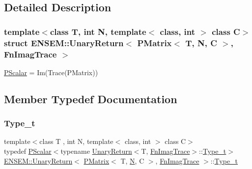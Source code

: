 \subsection{Detailed Description}
\subsubsection*{template$<$class T, int N, template$<$ class, int $>$ class C$>$\newline
struct E\+N\+S\+E\+M\+::\+Unary\+Return$<$ P\+Matrix$<$ T, N, C $>$, Fn\+Imag\+Trace $>$}

\mbox{\hyperlink{classENSEM_1_1PScalar}{P\+Scalar}} = Im(\+Trace(\+P\+Matrix)) 

\subsection{Member Typedef Documentation}
\mbox{\label{structENSEM_1_1UnaryReturn_3_01PMatrix_3_01T_00_01N_00_01C_01_4_00_01FnImagTrace_01_4_a631e4d167f62becbde56ab9d33138ccd}} 
\subsubsection{\texorpdfstring{Type\_t}{Type\_t}\hspace{0.1cm}{\footnotesize\ttfamily [1/3]}}
{\footnotesize\ttfamily template$<$class T , int N, template$<$ class, int $>$ class C$>$ \\
typedef \mbox{\hyperlink{classENSEM_1_1PScalar}{P\+Scalar}}$<$typename \mbox{\hyperlink{structENSEM_1_1UnaryReturn}{Unary\+Return}}$<$T, \mbox{\hyperlink{structENSEM_1_1FnImagTrace}{Fn\+Imag\+Trace}}$>$\+::\mbox{\hyperlink{structENSEM_1_1UnaryReturn_3_01PMatrix_3_01T_00_01N_00_01C_01_4_00_01FnImagTrace_01_4_a631e4d167f62becbde56ab9d33138ccd}{Type\+\_\+t}}$>$ \mbox{\hyperlink{structENSEM_1_1UnaryReturn}{E\+N\+S\+E\+M\+::\+Unary\+Return}}$<$ \mbox{\hyperlink{classENSEM_1_1PMatrix}{P\+Matrix}}$<$ T, \mbox{\hyperlink{adat__devel_2lib_2hadron_2operator__name__util_8cc_a7722c8ecbb62d99aee7ce68b1752f337}{N}}, C $>$, \mbox{\hyperlink{structENSEM_1_1FnImagTrace}{Fn\+Imag\+Trace}} $>$\+::\mbox{\hyperlink{structENSEM_1_1UnaryReturn_3_01PMatrix_3_01T_00_01N_00_01C_01_4_00_01FnImagTrace_01_4_a631e4d167f62becbde56ab9d33138ccd}{Type\+\_\+t}}}

